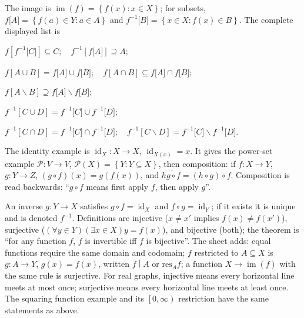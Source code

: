 The image is \(\operatorname{im}(f) = \left\{ {f(x):x \in X} \right\}\); for subsets, \(f\lbrack A\rbrack = \left\{ {f(a) \in Y:a \in A} \right\}\) and \(f^{- 1}\lbrack B\rbrack = \left\{ {x \in X:f(x) \in B} \right\}\). The complete displayed list is

\(f\left\lbrack {f^{- 1}\lbrack C\rbrack} \right\rbrack \subseteq C;\quad f^{- 1}\left\lbrack {f\lbrack A\rbrack} \right\rbrack \supseteq A;\)

\(f\left\lbrack {A \cup B} \right\rbrack = f\lbrack A\rbrack \cup f\lbrack B\rbrack;\quad f\left\lbrack {A \cap B} \right\rbrack \subseteq f\lbrack A\rbrack \cap f\lbrack B\rbrack;\)

\(f\left\lbrack {A \smallsetminus B} \right\rbrack \supseteq f\lbrack A\rbrack \smallsetminus f\lbrack B\rbrack;\)

\(f^{- 1}\left\lbrack {C \cup D} \right\rbrack = f^{- 1}\lbrack C\rbrack \cup f^{- 1}\lbrack D\rbrack;\)

\(f^{- 1}\left\lbrack {C \cap D} \right\rbrack = f^{- 1}\lbrack C\rbrack \cap f^{- 1}\lbrack D\rbrack;\quad f^{- 1}\left\lbrack {C \smallsetminus D} \right\rbrack = f^{- 1}\lbrack C\rbrack \smallsetminus f^{- 1}\lbrack D\rbrack.\)

The identity example is \(\operatorname{id}_{X}:X\rightarrow X\), \(\operatorname{id}_{X{(x)}} = x\). It gives the power-set example \(\mathcal{P}:V\rightarrow V\), \(\mathcal{P}(X) = \left\{ {Y:Y \subseteq X} \right\}\), then composition: if \(f:X\rightarrow Y\), \(g:Y\rightarrow Z\), \(\left( {g \circ f} \right)(x) = g\left( {f(x)} \right)\), and \(h\mathring{g\circ f} = \left( {h \circ g} \right) \circ f\). Composition is read backwards: ``\(g \circ f\) means first apply \(f\), then apply \(g\)''.

An inverse \(g:Y\rightarrow X\) satisfies \(g \circ f = \operatorname{id}_{X}\) and \(f \circ g = \operatorname{id}_{Y}\); if it exists it is unique and is denoted \(f^{- 1}\). Definitions are injective (\(x \neq x'\) implies \(f(x) \neq f\left( x' \right)\)), surjective (\(\left( {\forall y \in Y} \right)\left( {\exists x \in X} \right)y = f(x)\)), and bijective (both); the theorem is ``for any function \(f\), \(f\) is invertible iff \(f\) is bijective''. The sheet adds: equal functions require the same domain and codomain; \(f\) restricted to \(A \subseteq X\) is \(g:A\rightarrow Y\), \(g(x) = f(x)\), written \(\left. f \middle| A \right.\) or \(\text{res}_{A}f\); a function \(X\rightarrow\operatorname{im}(f)\) with the same rule is surjective. For real graphs, injective means every horizontal line meets at most once; surjective means every horizontal line meets at least once. The squaring function example and its \(\left\lbrack {0,\infty} \right)\) restriction have the same statements as above.

